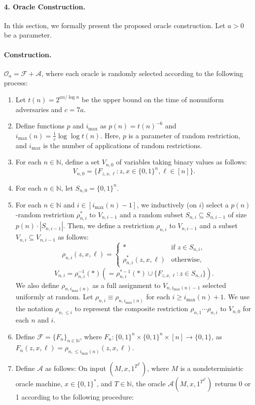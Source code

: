 \paragraph{4. Oracle Construction.}
In this section, we formally present the proposed oracle construction. Let $a>0$ be a parameter.
\paragraph{Construction.}
$\mathcal O_a=\mathcal F+\mathcal A$, where each oracle is randomly selected according to the following process:
\begin{enumerate}
\item Let $t(n)=2^{an/\log n}$ be the upper bound on the time of nonuniform adversaries and $c=7a$.
\item Define functions $p$ and $i_{\max}$ as $p(n)=t(n)^{-6}$ and $i_{\max}(n)=\frac1c\log\log t(n)$. Here, $p$ is a parameter of random restriction, and $i_{\max}$ is the number of applications of random restrictions.
\item For each $n\in\mathbb N$, define a set $V_{n,0}$ of variables taking binary values as follows:
\[V_{n,0}=\{F_{z,x,\ell}:z,x\in\{0,1\}^n,\ell\in[n]\}.\]
\item For each $n\in\mathbb N$, let $S_{n,0}=\{0,1\}^n$.
\item For each $n\in\mathbb N$ and $i\in[i_{\max}(n)-1]$, we inductively (on $i$) select a $p(n)$-random restriction $\rho^*_{n,i}$ to $V_{n,i-1}$ and a random subset $S_{n,i}\subseteq S_{n,i-1}$ of size $p(n)\cdot|S_{n,i-1}|$. Then, we define a restriction $\rho_{n,i}$ to $V_{n,i-1}$ and a subset $V_{n,i}\subseteq V_{n,i-1}$ as follows:
\[\rho_{n,i}(z,x,\ell)=\begin{cases}*&\text{if }z\in S_{n,i},\\\rho^*_{n,i}(z,x,\ell)&\text{otherwise},\end{cases}\]
\[V_{n,i}=\rho_{n,i}^{-1}(*)\left(=\rho_{n,i}^{*-1}(*)\cup\{F_{z,x,\ell}:z\in S_{n,i}\}\right).\]
We also define $\rho_{n,i_{\max}(n)}$ as a full assignment to $V_{n,i_{\max}(n)-1}$ selected uniformly at random. Let $\rho_{n,i}\equiv\rho_{n,i_{\max}(n)}$ for each $i\geq i_{\max}(n)+1$. We use the notation $\rho_{n,\leq i}$ to represent the composite restriction $\rho_{n,1}\cdots\rho_{n,i}$ to $V_{n,0}$ for each $n$ and $i$.
\item Define $\mathcal F=\{F_n\}_{n\in\mathbb N}$, where $F_n:\{0,1\}^n\times\{0,1\}^n\times[n]\to\{0,1\}$, as $F_n(z,x,\ell)=\rho_{n,\leq i_{\max}(n)}(z,x,\ell)$.
\item Define $\mathcal A$ as follows: On input $(M,x,1^{T^{2^c}})$, where $M$ is a nondeterministic oracle machine, $x\in\{0,1\}^*$, and $T\in\mathbb N$, the oracle $\mathcal A(M,x,1^{T^{2^c}})$ returns 0 or 1 according to the following procedure:

\end{enumerate}
